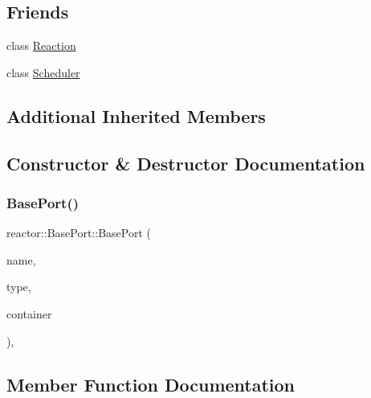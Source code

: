 \subsection*{Friends}
\begin{DoxyCompactItemize}
\item 
class \hyperlink{classreactor_1_1BasePort_a5f86463029cca47f8aa15ff8cd5b9e51}{Reaction}
\item 
class \hyperlink{classreactor_1_1BasePort_afb88c77ea5daaefa6c8fa6bc5b9aa5c1}{Scheduler}
\end{DoxyCompactItemize}
\subsection*{Additional Inherited Members}


\subsection{Constructor \& Destructor Documentation}
\mbox{\label{classreactor_1_1BasePort_abf23bbb8fdd982044fca7d253ca1d851}} 
\subsubsection{\texorpdfstring{Base\+Port()}{BasePort()}}
{\footnotesize\ttfamily reactor\+::\+Base\+Port\+::\+Base\+Port (\begin{DoxyParamCaption}\item[{const std\+::string \&}]{name,  }\item[{\hyperlink{namespacereactor_a08c8e2d85e5bc706b1af8a87e40eec6d}{Port\+Type}}]{type,  }\item[{\hyperlink{classreactor_1_1Reactor}{Reactor} $\ast$}]{container }\end{DoxyParamCaption})\hspace{0.3cm}{\ttfamily [inline]}, {\ttfamily [protected]}}



\subsection{Member Function Documentation}
\mbox{\label{classreactor_1_1BasePort_a9158ab37ab600ea2b8a39749ca9404c4}} 
